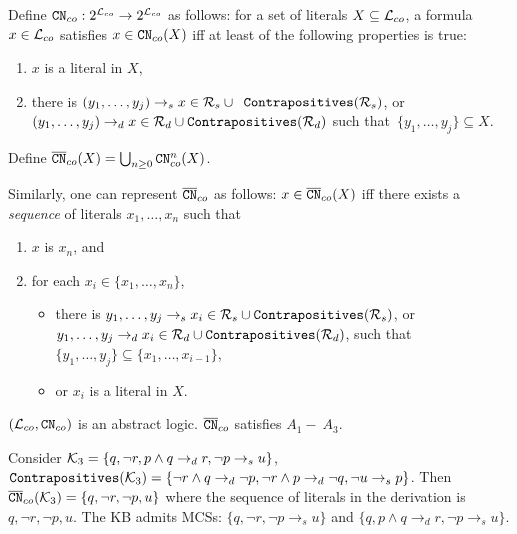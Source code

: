 \begin{definition}
\label{def:cn-contrapositive}
Define $\texttt{\textup{CN}}_{co} : 2^{\mathcal{L}_{co}} \to 2^{\mathcal{L}_{co}}$ as follows: for a set of literals $X \subseteq \mathcal{L}_{co}$, a formula $x \in \mathcal{L}_{co}$ satisfies $x \in \texttt{\textup{CN}}_{co}(X)$ iff at least of the following properties is true:
\begin{enumerate}
    \item $x$ is a literal in $X$,
    \item there is $(y_1,\ldots,y_j)\rightarrow_s x \in \mathcal{R}_{s} \cup \texttt{ \textup{Contrapositives}}(\mathcal{R}_s)$, or $(y_1,\ldots,y_j)\rightarrow_d x \in \mathcal{R}_{d}  \cup \texttt{\textup{Contrapositives}}(\mathcal{R}_d)$ such that~$\{ y_1,\ldots,y_j \} \subseteq X$.
\end{enumerate}
Define $\overline{\texttt{\textup{CN}}}_{co}(X) = \bigcup_{n \geq 0}\texttt{\textup{CN}}_{co}^{n}(X)$.
\end{definition}

\begin{remark}
Similarly, one can represent $\overline{\texttt{\textup{CN}}}_{co}$ as follows: $x \in \overline{\texttt{\textup{CN}}}_{co}(X)$ iff there exists a \emph{sequence} of literals $x_1, \ldots, x_n$ such that
\begin{enumerate}
    \item $x$ is $x_n$, and
    \item for each $x_i \in \{x_1, \ldots, x_n \}$,
    \begin{itemize}
        \item  there is $ y_1 , \ldots , y_j \rightarrow_{s} x_i \in \mathcal{R}_s \cup \texttt{\textup{Contrapositives}}(\mathcal{R}_s)$, or $ y_1 , \ldots , y_j \rightarrow_{d} x_i \in \mathcal{R}_d \cup \texttt{\textup{Contrapositives}}(\mathcal{R}_d)$, such that $\{ y_1 , \ldots , y_j \} \subseteq \{x_1, \ldots , x_{i-1} \}$,
        \item or $x_i$ is a literal in $X$.
    \end{itemize}
\end{enumerate}
\end{remark}

\begin{proposition} 
    $(\mathcal{L}_{co}, \texttt{\textup{CN}}_{co})$ is an abstract logic. $\overline{\texttt{\textup{CN}}}_{co}$ satisfies $A_1 -\ A_3$.
\end{proposition}



\begin{example}
    Consider $\mathcal{K}_3 = \{q, \neg r, p \wedge q \rightarrow_{d} r, \neg p \rightarrow_s u\}$, $\texttt{\textup{Contrapositives}}(\mathcal{K}_3) = \{\neg r \wedge q \rightarrow_{d} \neg p, \neg r \wedge p \rightarrow_{d} \neg q, \neg u \rightarrow_s p\}$. Then $\overline{\texttt{\textup{CN}}}_{co}(\mathcal{K}_3) = \{q, \neg r, \neg p, u\}$  where the sequence of literals in the derivation is $q, \neg r, \neg p, u$. The KB admits MCSs: $\{q, \neg r, \neg p \rightarrow_s u \}$ and $\{q, p \wedge q \rightarrow_{d} r, \neg p \rightarrow_s u\} $.
\end{example}





